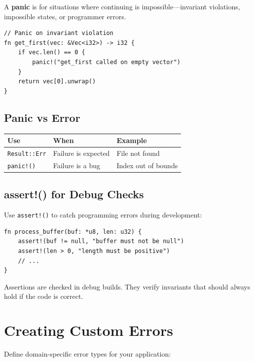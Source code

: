A \textbf{panic} is for situations where continuing is impossible---invariant violations, impossible states, or programmer errors.

\begin{lstlisting}
// Panic on invariant violation
fn get_first(vec: &Vec<i32>) -> i32 {
    if vec.len() == 0 {
        panic!("get_first called on empty vector")
    }
    return vec[0].unwrap()
}
\end{lstlisting}

\subsection{Panic vs Error}

\begin{center}
\begin{tabular}{lll}
\textbf{Use} & \textbf{When} & \textbf{Example} \\
\hline
\texttt{Result::Err} & Failure is expected & File not found \\
\texttt{panic!()} & Failure is a bug & Index out of bounds \\
\end{tabular}
\end{center}

\subsection{assert!() for Debug Checks}

Use \texttt{assert!()} to catch programming errors during development:

\begin{lstlisting}
fn process_buffer(buf: *u8, len: u32) {
    assert!(buf != null, "buffer must not be null")
    assert!(len > 0, "length must be positive")
    // ...
}
\end{lstlisting}

Assertions are checked in debug builds. They verify invariants that should always hold if the code is correct.

\section{Creating Custom Errors}
\label{sec:custom-errors}

Define domain-specific error types for your application:

